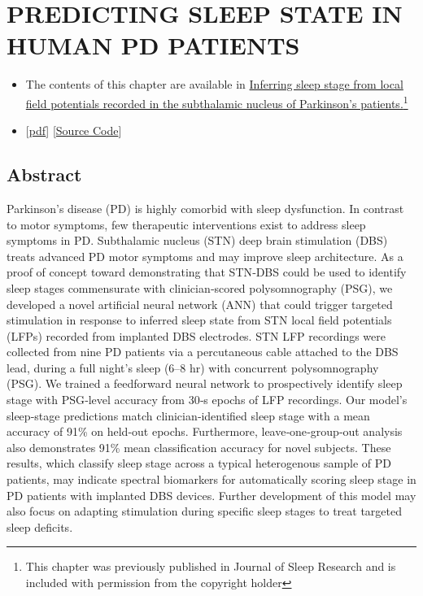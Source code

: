 \documentclass{templates/ucdenverthesis}
\begin{document}
\hypertarget{ch3:jsr}{%
\chapter{PREDICTING SLEEP STATE IN HUMAN PD PATIENTS}\label{ch3:jsr}}

\begin{itemize}
\item
  The contents of this chapter are available in \href{https://doi.org/10.1111/jsr.12806}{Inferring sleep stage from local field potentials recorded in the subthalamic nucleus of Parkinson's patients.}\footnote{This chapter was previously published in \autocite{Christensen:2019ik} Journal of Sleep Research and is included with permission from the copyright holder}
\item
  {[}\href{http://www.jzlab.org/Christensen_JSleepResearch2018_LFP_ANN_DBS.pdf}{pdf}{]} {[}\href{https://github.com/jzlab/sleep_net}{Source Code}{]}
\end{itemize}

\hypertarget{abstract}{%
\section*{Abstract}\label{abstract}}

Parkinson's disease (PD) is highly comorbid with sleep dysfunction. In contrast to motor symptoms, few therapeutic interventions exist to address sleep symptoms in PD. Subthalamic nucleus (STN) deep brain stimulation (DBS) treats advanced PD motor symptoms and may improve sleep architecture. As a proof of concept toward demonstrating that STN‐DBS could be used to identify sleep stages commensurate with clinician‐scored polysomnography (PSG), we developed a novel artificial neural network (ANN) that could trigger targeted stimulation in response to inferred sleep state from STN local field potentials (LFPs) recorded from implanted DBS electrodes. STN LFP recordings were collected from nine PD patients via a percutaneous cable attached to the DBS lead, during a full night's sleep (6--8 hr) with concurrent polysomnography (PSG). We trained a feedforward neural network to prospectively identify sleep stage with PSG‐level accuracy from 30‐s epochs of LFP recordings. Our model's sleep‐stage predictions match clinician‐identified sleep stage with a mean accuracy of 91\% on held‐out epochs. Furthermore, leave‐one‐group‐out analysis also demonstrates 91\% mean classification accuracy for novel subjects. These results, which classify sleep stage across a typical heterogenous sample of PD patients, may indicate spectral biomarkers for automatically scoring sleep stage in PD patients with implanted DBS devices. Further development of this model may also focus on adapting stimulation during specific sleep stages to treat targeted sleep deficits.
\end{document}
